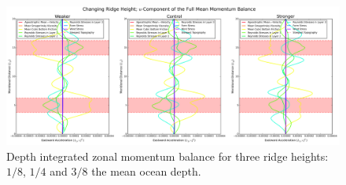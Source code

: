 \documentclass[12pt,a4paper]{report}
\newcommand*\figref[1]{Figure~\ref{#1}}
\begin{document}
%  
%  
%  
%  
%  
  
  
  \begin{figure}
  	\centering
  	\includegraphics[width=\linewidth]{umom_2_4}
  	\caption{ Depth integrated zonal momentum balance for three ridge heights: 
  		$1/8$, $1/4$ and $3/8$ the mean ocean depth.}
  	\label{fig:umombalanceheight}
  \end{figure}
  
\end{document}
